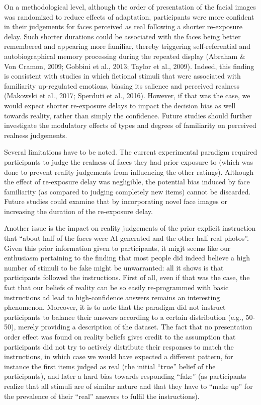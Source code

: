 \documentclass[
  man,floatsintext]{apa6}
\begin{document}
On a methodological level, although the order of presentation of the facial images was randomized to reduce effects of adaptation, participants were more confident in their judgements for faces perceived as real following a shorter re-exposure delay. Such shorter durations could be associated with the faces being better remembered and appearing more familiar, thereby triggering self-referential and autobiographical memory processing during the repeated display (Abraham \& Von Cramon, 2009; Gobbini et al., 2013; Taylor et al., 2009). Indeed, this finding is consistent with studies in which fictional stimuli that were associated with familiarity up-regulated emotions, biasing its salience and perceived realness (Makowski et al., 2017; Sperduti et al., 2016). However, if that was the case, we would expect shorter re-exposure delays to impact the decision bias as well towards reality, rather than simply the confidence. Future studies should further investigate the modulatory effects of types and degrees of familiarity on perceived realness judgements.

Several limitations have to be noted. The current experimental paradigm required participants to judge the realness of faces they had prior exposure to (which was done to prevent reality judgements from influencing the other ratings). Although the effect of re-exposure delay was negligible, the potential bias induced by face familiarity (as compared to judging completely new items) cannot be discarded. Future studies could examine that by incorporating novel face images or increasing the duration of the re-exposure delay.

Another issue is the impact on reality judgements of the prior explicit instruction that ``about half of the faces were AI-generated and the other half real photos''. Given this prior information given to participants, it migjt seems like our enthusiasm pertaining to the finding that most people did indeed believe a high number of stimuli to be fake might be unwarranted: all it shows is that participants followed the instructions. First of all, even if that was the case, the fact that our beliefs of reality can be so easily re-programmed with basic instructions ad lead to high-confidence answers remains an interesting phenomenon. Moreover, it is to note that the paradigm did not instruct participants to balance their answers according to a certain distribution (e.g., 50-50), merely providing a description of the dataset. The fact that no presentation order effect was found on reality beliefs gives credit to the assumption that participants did not try to actively distribute their responses to match the instructions, in which case we would have expected a different pattern, for instance the first items judged as real (the initial ``true'' belief of the participants), and later a hard bias towards responding ``fake'' (as participants realize that all stimuli are of similar nature and that they have to ``make up'' for the prevalence of their ``real'' answers to fulfil the instructions).
\end{document}

